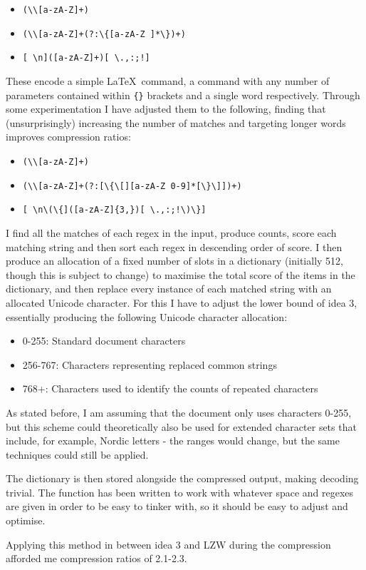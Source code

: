 \documentclass[11pt]{article} %
\begin{document}
\begin{itemize}
	\item \verb|(\\[a-zA-Z]+)|
	\item \verb|(\\[a-zA-Z]+(?:\{[a-zA-Z ]*\})+)|
	\item \verb|[ \n]([a-zA-Z]+)[ \.,:;!]|
\end{itemize}

These encode a simple \rmfamily\LaTeX\normalfont\, command, a command with any number of parameters contained within \verb|{}| brackets and a single word respectively. Through some experimentation I have adjusted them to the following, finding that (unsurprisingly) increasing the number of matches and targeting longer words improves compression ratios:

\begin{itemize}
	\item \verb|(\\[a-zA-Z]+)|
	\item \verb|(\\[a-zA-Z]+(?:[\{\[][a-zA-Z 0-9]*[\}\]])+)|
	\item \verb|[ \n\(\{]([a-zA-Z]{3,})[ \.,:;!\)\}]|
\end{itemize}

I find all the matches of each regex in the input, produce counts, score each matching string and then sort each regex in descending order of score. I then produce an allocation of a fixed number of slots in a dictionary (initially 512, though this is subject to change) to maximise the total score of the items in the dictionary, and then replace every instance of each matched string with an allocated Unicode character. For this I have to adjust the lower bound of idea 3, essentially producing the following Unicode character allocation:

\begin{itemize}
	\item 0-255: Standard document characters
	\item 256-767: Characters representing replaced common strings
	\item 768+: Characters used to identify the counts of repeated characters
\end{itemize}

As stated before, I am assuming that the document only uses characters 0-255, but this scheme could theoretically also be used for extended character sets that include, for example, Nordic letters - the ranges would change, but the same techniques could still be applied.

The dictionary is then stored alongside the compressed output, making decoding trivial. The function has been written to work with whatever space and regexes are given in order to be easy to tinker with, so it should be easy to adjust and optimise.

Applying this method in between idea 3 and LZW during the compression afforded me compression ratios of 2.1-2.3.
\end{document}
